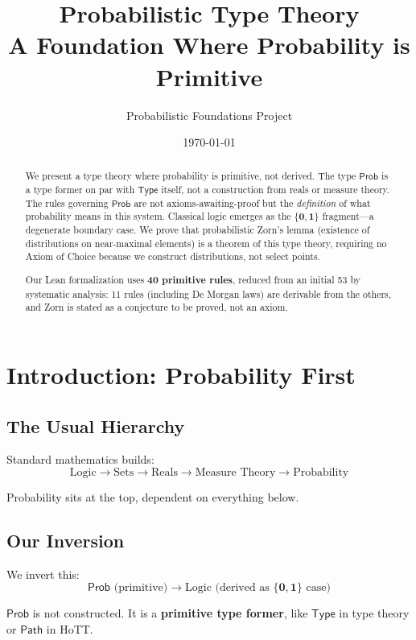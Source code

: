 \documentclass[11pt,a4paper]{article}
\title{Probabilistic Type Theory\\[0.5em]
\large A Foundation Where Probability is Primitive}
\author{Probabilistic Foundations Project}
\date{\today}
\newcommand{\Prob}{\mathsf{Prob}}
\newcommand{\Type}{\mathsf{Type}}
\newcommand{\pzero}{\mathbf{0}}
\newcommand{\pone}{\mathbf{1}}
\begin{document}
\maketitle

\begin{abstract}
We present a type theory where probability is primitive, not derived. The type $\Prob$ is a type former on par with $\Type$ itself, not a construction from reals or measure theory. The rules governing $\Prob$ are not axioms-awaiting-proof but the \emph{definition} of what probability means in this system. Classical logic emerges as the $\{\pzero, \pone\}$ fragment---a degenerate boundary case. We prove that probabilistic Zorn's lemma (existence of distributions on near-maximal elements) is a theorem of this type theory, requiring no Axiom of Choice because we construct distributions, not select points.

Our Lean formalization uses \textbf{40 primitive rules}, reduced from an initial 53 by systematic analysis: 11 rules (including De Morgan laws) are derivable from the others, and Zorn is stated as a conjecture to be proved, not an axiom.
\end{abstract}

\tableofcontents

\section{Introduction: Probability First}

\subsection{The Usual Hierarchy}

Standard mathematics builds:
\[
\text{Logic} \to \text{Sets} \to \text{Reals} \to \text{Measure Theory} \to \text{Probability}
\]

Probability sits at the top, dependent on everything below.

\subsection{Our Inversion}

We invert this:
\[
\Prob \text{ (primitive)} \to \text{Logic (derived as } \{\pzero,\pone\} \text{ case)}
\]

$\Prob$ is not constructed. It is a \textbf{primitive type former}, like $\Type$ in type theory or $\mathsf{Path}$ in HoTT.
\end{document}
